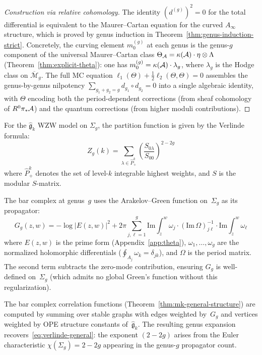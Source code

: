 \begin{proof}[Construction via relative cohomology]
The identity $(d^{(g)})^2 = 0$ for the total differential is equivalent to the Maurer--Cartan equation for the curved $A_\infty$ structure, which is proved by genus induction in Theorem~\ref{thm:genus-induction-strict}.
Concretely, the curving element $m_0^{(g)}$ at each genus is the
genus-$g$ component of the universal Maurer--Cartan class
$\Theta_{\mathcal{A}} = \kappa(\mathcal{A}) \cdot \eta \otimes \Lambda$
(Theorem~\ref{thm:explicit-theta}): one has
$m_0^{(g)} = \kappa(\mathcal{A}) \cdot \lambda_g$, where $\lambda_g$ is
the Hodge class on $\overline{\mathcal{M}}_g$.  The full MC equation
$\ell_1(\Theta) + \tfrac{1}{2}\ell_2(\Theta,\Theta) = 0$ assembles
the genus-by-genus nilpotency $\sum_{g_1+g_2=g} d_{g_1} \circ d_{g_2}
= 0$ into a single algebraic identity, with $\Theta$ encoding both
the period-dependent corrections (from sheaf cohomology of
$R^0\pi_*\mathcal{A}$) and the quantum corrections (from higher moduli
contributions).
\end{proof}

\begin{example}
For the $\widehat{\mathfrak{g}}_k$ WZW model on $\Sigma_g$, the partition function is given by the Verlinde formula:
\begin{equation}\label{eq:verlinde-general}
Z_g(k) = \sum_{\lambda \in \hat{P}_+^k} \left(\frac{S_{0\lambda}}{S_{00}}\right)^{2-2g}
\end{equation}
where $\hat{P}_+^k$ denotes the set of level-$k$ integrable highest weights, and $S$ is the modular $S$-matrix.

The bar complex at genus~$g$ uses the Arakelov--Green function on~$\Sigma_g$ as its propagator:
\[G_g(z,w) = -\log|E(z,w)|^2 + 2\pi\sum_{j,\ell=1}^g \mathrm{Im}\!\int_z^w \omega_j \cdot (\mathrm{Im}\,\Omega)^{-1}_{j\ell} \cdot \mathrm{Im}\!\int_z^w \omega_\ell\]
where $E(z,w)$ is the prime form (Appendix~\ref{app:theta}), $\omega_1, \ldots, \omega_g$ are the normalized holomorphic differentials ($\oint_{A_j}\omega_k = \delta_{jk}$), and $\Omega$ is the period matrix.  The second term subtracts the zero-mode contribution, ensuring $G_g$ is well-defined on~$\Sigma_g$ (which admits no global Green's function without this regularization).

The bar complex correlation functions (Theorem~\ref{thm:mk-general-structure}) are computed by summing over stable graphs with edges weighted by~$G_g$ and vertices weighted by OPE structure constants of~$\widehat{\mathfrak{g}}_k$.  The resulting genus expansion recovers~\eqref{eq:verlinde-general}: the exponent $(2-2g)$ arises from the Euler characteristic $\chi(\Sigma_g) = 2 - 2g$ appearing in the genus-$g$ propagator count.
\end{example}


